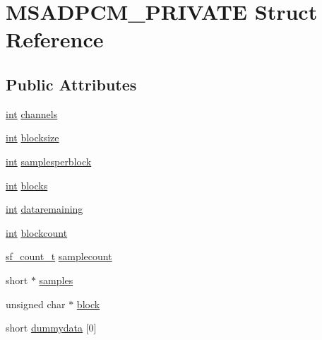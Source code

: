 \hypertarget{struct_m_s_a_d_p_c_m___p_r_i_v_a_t_e}{}\section{M\+S\+A\+D\+P\+C\+M\+\_\+\+P\+R\+I\+V\+A\+TE Struct Reference}
\label{struct_m_s_a_d_p_c_m___p_r_i_v_a_t_e}
\subsection*{Public Attributes}
\begin{DoxyCompactItemize}
\item 
\hyperlink{xmltok_8h_a5a0d4a5641ce434f1d23533f2b2e6653}{int} \hyperlink{struct_m_s_a_d_p_c_m___p_r_i_v_a_t_e_aa3e1a6d1616e9a1905218debb872bbf6}{channels}
\item 
\hyperlink{xmltok_8h_a5a0d4a5641ce434f1d23533f2b2e6653}{int} \hyperlink{struct_m_s_a_d_p_c_m___p_r_i_v_a_t_e_ab2f9a028faec2797e07fee0c41716820}{blocksize}
\item 
\hyperlink{xmltok_8h_a5a0d4a5641ce434f1d23533f2b2e6653}{int} \hyperlink{struct_m_s_a_d_p_c_m___p_r_i_v_a_t_e_a8716eff02e0112009cf164b88300e378}{samplesperblock}
\item 
\hyperlink{xmltok_8h_a5a0d4a5641ce434f1d23533f2b2e6653}{int} \hyperlink{struct_m_s_a_d_p_c_m___p_r_i_v_a_t_e_af26b3a83a31f5b650173d12496b3400a}{blocks}
\item 
\hyperlink{xmltok_8h_a5a0d4a5641ce434f1d23533f2b2e6653}{int} \hyperlink{struct_m_s_a_d_p_c_m___p_r_i_v_a_t_e_aba95b775a61bbaf14a82dd1528829b9c}{dataremaining}
\item 
\hyperlink{xmltok_8h_a5a0d4a5641ce434f1d23533f2b2e6653}{int} \hyperlink{struct_m_s_a_d_p_c_m___p_r_i_v_a_t_e_a738fd5659f3bca7d31d2ce9e3c73f94b}{blockcount}
\item 
\hyperlink{mac_2config_2i386_2lib-src_2libsndfile_2src_2sndfile_8h_a398121a5f562230ea7f772528fff5f84}{sf\+\_\+count\+\_\+t} \hyperlink{struct_m_s_a_d_p_c_m___p_r_i_v_a_t_e_aba37d12cd0cfbb1952d4c695b4d77d7a}{samplecount}
\item 
short $\ast$ \hyperlink{struct_m_s_a_d_p_c_m___p_r_i_v_a_t_e_a310622e90cd62c15c62e9822f37d2fa7}{samples}
\item 
unsigned char $\ast$ \hyperlink{struct_m_s_a_d_p_c_m___p_r_i_v_a_t_e_a0a1ccea321756020099f0ba9b445200a}{block}
\item 
short \hyperlink{struct_m_s_a_d_p_c_m___p_r_i_v_a_t_e_a5ec05e80eba73a4ab6187688ccdaff34}{dummydata} \mbox{[}0\mbox{]}
\end{DoxyCompactItemize}


